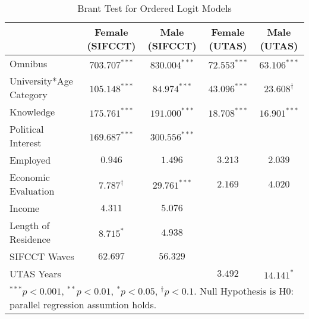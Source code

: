 
\begin{table}
\caption{Brant Test for Ordered Logit Models}
\begin{center}
\begin{tabular}{l c c c c }
\toprule
 & Female (SIFCCT) & Male (SIFCCT) & Female (UTAS) & Male (UTAS) \\
\midrule
Omnibus                 & $703.707^{***}$   & $830.004^{***}$ & $72.553^{***}$ & $63.106^{***}$     \\
University*Age Category & $105.148^{***}$   & $84.974^{***}$  & $43.096^{***}$ & $23.608^{\dagger}$ \\
Knowledge               & $175.761^{***}$   & $191.000^{***}$ & $18.708^{***}$ & $16.901^{***}$     \\
Political Interest      & $169.687^{***}$   & $300.556^{***}$ &                &                    \\
Employed                & $0.946$           & $1.496$         & $3.213$        & $2.039$            \\
Economic Evaluation     & $7.787^{\dagger}$ & $29.761^{***}$  & $2.169$        & $4.020$            \\
Income                  & $4.311$           & $5.076$         &                &                    \\
Length of Residence     & $8.715^{*}$       & $4.938$         &                &                    \\
SIFCCT Waves            & $62.697$          & $56.329$        &                &                    \\
UTAS Years              &                   &                 & $3.492$        & $14.141^{*}$       \\
\bottomrule
\multicolumn{5}{l}{\scriptsize{$^{***}p<0.001$, $^{**}p<0.01$, $^*p<0.05$, $^{\dagger}p<0.1$. Null Hypothesis is H0: parallel regression assumtion holds.}}
\end{tabular}
\label{oltab_brant}
\end{center}
\end{table}

